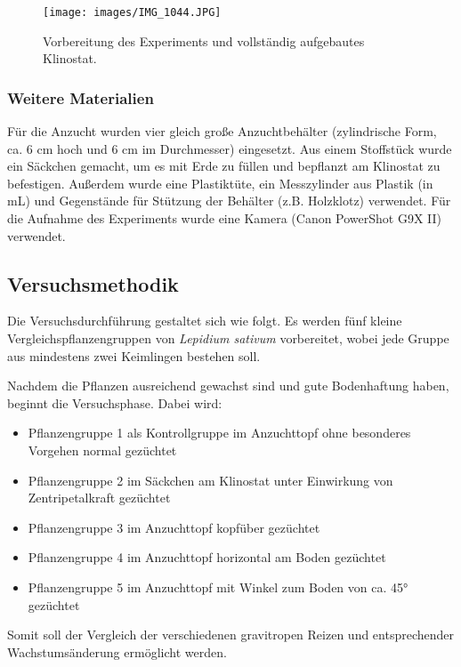\documentclass[
11pt, 
ngerman,
listof=totocnumbered,
oneside,
bibliography=totocnumbered,
abstracton
]{scrreprt}
\begin{document}
\begin{figure}[H]
	\centering 
	\texttt{[image: images/IMG\_1044.JPG]}
	\caption{Vorbereitung des Experiments und vollständig aufgebautes Klinostat.\label{Klinostat2}}
\end{figure}

\subsubsection{Weitere Materialien}

Für die Anzucht wurden vier gleich große Anzuchtbehälter (zylindrische Form, ca. 6 cm hoch und 6 cm im Durchmesser) eingesetzt. Aus einem Stoffstück wurde ein Säckchen gemacht, um es mit Erde zu füllen und bepflanzt am Klinostat zu befestigen. Außerdem wurde eine Plastiktüte, ein Messzylinder aus Plastik (in mL) und Gegenstände für Stützung der Behälter (z.B. Holzklotz) verwendet. Für die Aufnahme des Experiments wurde eine Kamera (Canon PowerShot G9X II) verwendet.

\subsection{Versuchsmethodik}

Die Versuchsdurchführung gestaltet sich wie folgt. Es werden fünf kleine Vergleichspflanzengruppen von \emph{Lepidium sativum} vorbereitet, wobei jede Gruppe aus mindestens zwei Keimlingen bestehen soll. 

Nachdem die Pflanzen ausreichend gewachst sind und gute Bodenhaftung haben, beginnt die Versuchsphase. Dabei wird: 

\begin{itemize}
	\item Pflanzengruppe 1 als Kontrollgruppe im Anzuchttopf ohne besonderes Vorgehen normal gezüchtet
	\item Pflanzengruppe 2 im Säckchen am Klinostat unter Einwirkung von Zentripetalkraft gezüchtet
	\item Pflanzengruppe 3 im Anzuchttopf kopfüber gezüchtet
	\item Pflanzengruppe 4 im Anzuchttopf horizontal am Boden gezüchtet
	\item Pflanzengruppe 5 im Anzuchttopf mit Winkel zum Boden von ca. \ang{45} gezüchtet 
\end{itemize}

Somit soll der Vergleich der verschiedenen gravitropen Reizen und entsprechender Wachstumsänderung ermöglicht werden. 
\end{document}
